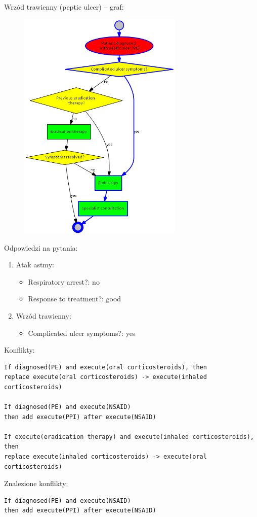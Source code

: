 \newpage
Wrzód trawienny (peptic ulcer) – graf:
\begin{figure}[H]
\centering
\includegraphics[width=0.7\textwidth]{img/peptic-ulcer.png}
\end{figure}
\newpage
\noindent Odpowiedzi na pytania:
\begin{enumerate}
\item{Atak astmy:
	\begin{itemize}
	\item{Respiratory arrest?: no}
	\item{Response to treatment?: good}
	\end{itemize}
}
\item{Wrzód trawienny:
	\begin{itemize}
	\item{Complicated ulcer symptoms?: yes}
	\end{itemize}
}
\end{enumerate}
Konflikty:
\begin{verbatim}
If diagnosed(PE) and execute(oral corticosteroids), then 
replace execute(oral corticosteroids) -> execute(inhaled corticosteroids)

If diagnosed(PE) and execute(NSAID)
then add execute(PPI) after execute(NSAID)

If execute(eradication therapy) and execute(inhaled corticosteroids), then
replace execute(inhaled corticosteroids) -> execute(oral corticosteroids)
\end{verbatim}
Znalezione konflikty:
\begin{verbatim}
If diagnosed(PE) and execute(NSAID) 
then add execute(PPI) after execute(NSAID)
\end{verbatim}
\newpage
